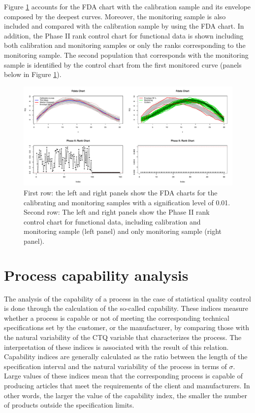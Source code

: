Figure \ref{fig:fda_4} accounts for the FDA chart with the calibration sample and its envelope composed by the deepest curves. Moreover, the monitoring sample is also included and compared with the calibration sample by using the FDA chart. In addition, the Phase II rank control chart for functional data is shown including both calibration and monitoring samples or only the ranks corresponding to the monitoring sample. The second population that corresponds with the monitoring sample is identified by the control chart from the first monitored curve (panels below in Figure \ref{fig:fda_4}).

\begin{figure}[!htb]
\begin{center}
\includegraphics[width=\textwidth]{fda_4}
\caption{First row: the left and right panels show the FDA charts for the calibrating and monitoring samples with a signification level of 0.01. Second row: The left and right panels show the Phase II rank control chart for functional data, including calibration and monitoring sample (left panel) and only monitoring sample (right panel).}
\label{fig:fda_4}
\end{center}
\end{figure}






\section{Process capability analysis}

The analysis of the capability of a process in the case of statistical quality control is done through the calculation of the so-called capability. 
These indices measure whether a process is capable or not of meeting the corresponding technical specifications set by the customer, or the manufacturer, by comparing those with the natural variability of the CTQ variable that characterizes the process. 
The interpretation of these indices is associated with the result of this relation. 
Capability indices are generally calculated as the ratio between the length of the specification interval and the natural variability of the process in terms of $\sigma$. 
Large values of these indices mean that the corresponding process is capable of producing articles that meet the requirements of the client and manufacturers.
In other words, the larger the value of the capability index, the smaller the number of products outside the specification limits.

